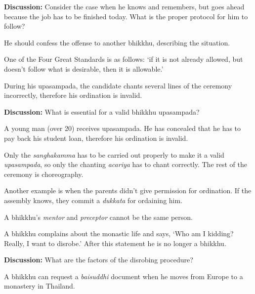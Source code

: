 \begin{exam}{\autoExamName}
\begin{problem*}
\begin{parts}
    \textbf{Discussion:} Consider the case when he knows and remembers, but goes
    ahead because the job has to be finished today. What is the proper protocol
    for him to follow?

    \begin{solution}
      He should confess the offense to another bhikkhu, describing the situation.
    \end{solution}

  \item {} One of the Four Great Standards is as follows: `if it is not
    already allowed, but doesn't follow what is desirable, then it is
    allowable.'

  \item {} During his upasampada, the candidate chants several lines of the
    ceremony incorrectly, therefore his ordination is invalid.

    \bigskip

    \textbf{Discussion:} What is essential for a valid bhikkhu upasampada?
    
  \item {} A young man (over 20) receives upasampada. He has concealed that
    he has to pay back his student loan, therefore his ordination is invalid.

    \begin{solution}
      Only the \emph{sanghakamma} has to be carried out properly to make it a
      valid \emph{upasampada}, so only the chanting \emph{acariya} has to chant
      correctly. The rest of the ceremony is choreography.

      Another example is when the parents didn't give permission for ordination.
      If the assembly knows, they commit a \emph{dukkata} for ordaining him.
    \end{solution}

  \item {} A bhikkhu's \emph{mentor} and \emph{preceptor} cannot be the same
    person.

  \item {} A bhikkhu complains about the monastic life and says, `Who am I kidding? Really,
    I want to disrobe.' After this statement he is no longer a bhikkhu.

    \bigskip

    \textbf{Discussion:} What are the factors of the disrobing procedure?

  \item {} A bhikkhu can request a \emph{baisuddhi} document when he moves from Europe to a monastery in Thailand.


\end{parts}
\end{problem*}
\end{exam}
